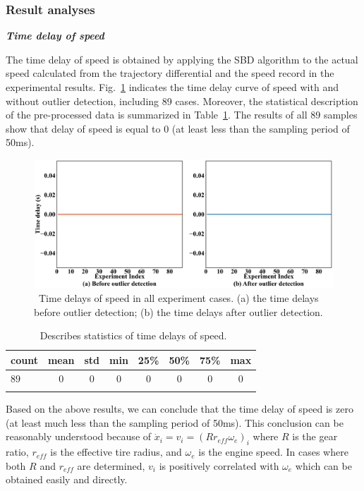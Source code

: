 \documentclass[a4paper]{cas-sc}
\begin{document}
\subsubsection{Result analyses}
\label{Section 3.2.2}

\textbf{\emph{Time delay of speed}}

The time delay of speed is obtained by applying the SBD algorithm to the actual speed calculated from the trajectory differential and the speed record in the experimental results. Fig.~\ref{fig3} indicates the time delay curve of speed with and without outlier detection, including 89 cases. Moreover, the statistical description of the pre-processed data is summarized in Table~\ref{table2}. The results of all 89 samples show that delay of speed is equal to 0 (at least less than the sampling period of 50ms).

\begin{figure}
  \centering
  \includegraphics[width=14cm]{figs/fig3.png}
  \caption{~Time delays of speed in all experiment cases. (a) the time delays before outlier detection; (b) the time delays after outlier detection.}
  \label{fig3}
\end{figure}

\begin{table}
  \centering
  \setlength{\abovecaptionskip}{0pt}
  \setlength{\belowcaptionskip}{10pt}%
  \caption{~Describes statistics of time delays of speed.}
  {\begin{tabular}{lccccccc} \toprule
      count & mean & std & min & 25\% & 50\% & 75\% & max \\ \midrule
      $89$  & $0$  & $0$ & $0$ & $0$  & $0$  & $0$  & $0$ \\
      \bottomrule
      \label{table2}
    \end{tabular}}
\end{table}


Based on the above results, we can conclude that the time delay of speed is zero (at least much less than the sampling period of 50ms). This conclusion can be reasonably understood because of ${\dot{x}}_i=v_i=\left(Rr_{eff}\omega_e\right)_i$ where $R$ is the gear ratio, $r_{eff}$ is the effective tire radius, and $\omega_e$ is the engine speed. In cases where both $R$ and $r_{eff}$ are determined, $v_i$ is positively correlated with $\omega_e$ which can be obtained easily and directly.
\end{document}
